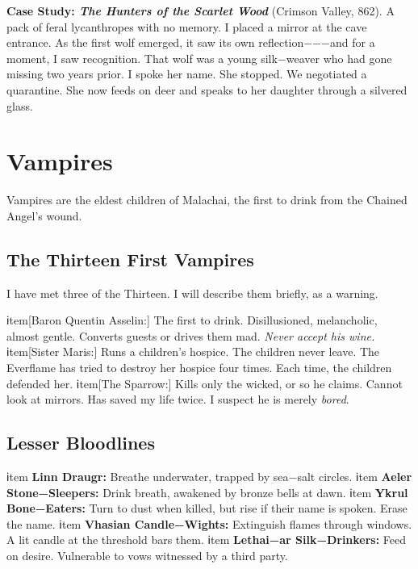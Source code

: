 \textbf{Case Study: \emph{The Hunters of the Scarlet Wood}} (Crimson Valley, 862). A pack of feral lycanthropes with no memory. I placed a mirror at the cave entrance. As the first wolf emerged, it saw its own reflection−−−and for a moment, I saw recognition. That wolf was a young silk−weaver who had gone missing two years prior. I spoke her name. She stopped. We negotiated a quarantine. She now feeds on deer and speaks to her daughter through a silvered glass.

\section{Vampires}

Vampires are the eldest children of Malachai, the first to drink from the Chained Angel's wound.

\subsection{The Thirteen First Vampires}

I have met three of the Thirteen. I will describe them briefly, as a warning.

\begin{description}
  ℹtem[Baron Quentin Asselin:] The first to drink. Disillusioned, melancholic, almost gentle. Converts guests or drives them mad. \emph{Never accept his wine.}
  ℹtem[Sister Maris:] Runs a children's hospice. The children never leave. The Everflame has tried to destroy her hospice four times. Each time, the children defended her.
  ℹtem[The Sparrow:] Kills only the wicked, or so he claims. Cannot look at mirrors. Has saved my life twice. I suspect he is merely \emph{bored}.
\end{description}

\subsection{Lesser Bloodlines}

\begin{itemize}
  ℹtem \textbf{Linn Draugr:} Breathe underwater, trapped by sea−salt circles.
  ℹtem \textbf{Aeler Stone−Sleepers:} Drink breath, awakened by bronze bells at dawn.
  ℹtem \textbf{Ykrul Bone−Eaters:} Turn to dust when killed, but rise if their name is spoken. Erase the name.
  ℹtem \textbf{Vhasian Candle−Wights:} Extinguish flames through windows. A lit candle at the threshold bars them.
  ℹtem \textbf{Lethai−ar Silk−Drinkers:} Feed on desire. Vulnerable to vows witnessed by a third party.
\end{itemize}

